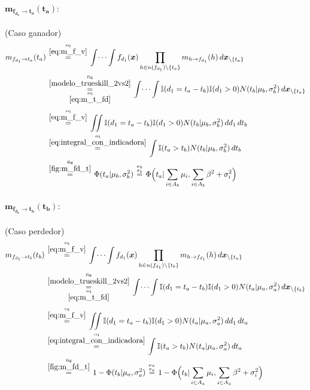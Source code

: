 \documentclass[article]{jss}
\newcommand\hfrac[2]{\genfrac{}{}{0pt}{}{#1}{#2}} %
\begin{document}
\begin{appendix}
\paragraph{$\bm{m_{f_{d_1} \rightarrow t_a}(t_a)}:$} (Caso ganador)
\begin{equation}\label{eq:m_fd_ta}
\begin{split}
m_{f_{d_1} \rightarrow t_a}(t_a) & \overset{\hfrac{\text{eq}}{\ref{eq:m_f_v}}}{=} \int \dots \int f_{d_1}(\bm{x}) \prod_{h \in n(f_{d_1}) \setminus \{t_a\} } m_{h \rightarrow f_{d_1}}(h) \, d\bm{x}_{\setminus \{t_a\} }  \\
&\overset{\hfrac{\text{fig}}{\ref{modelo_trueskill_2vs2}}}{\underset{\hfrac{\text{eq}}{\ref{eq:m_t_fd}}}{=}}  \int \dots \int \mathbb{I}(d_1 = t_a - t_b) \mathbb{I}(d_1 > 0) N(t_b | \mu_b , \sigma_b^2 )  \, d\bm{x}_{\setminus \{t_a\} } \\[0.1cm]
& \overset{\hfrac{\text{eq}}{\ref{eq:m_f_v}}}{=} \iint \mathbb{I}(d_1 = t_a - t_b) \mathbb{I}(d_1 > 0) N(t_b | \mu_b , \sigma_b^2 ) \, dd_1\,dt_b \\
& \overset{\hfrac{\text{eq}}{\ref{eq:integral_con_indicadora}}}{=} \int \mathbb{I}( t_a > t_b)  N(t_b | \mu_b , \sigma_b^2 ) \,dt_b  \\
& \overset{\hfrac{\text{fig}}{\ref{fig:m_fd_t}}}{=} \Phi (t_a| \mu_b, \sigma_b^2)  \overset{\hfrac{\mu_b}{\sigma_b}}{=}  \Phi \Big(t_a| \sum_{i \in A_b} \mu_i , \sum_{i \in A_b} \beta^2 + \sigma_i^2 \Big)
\end{split}
\end{equation}

\paragraph{$\bm{m_{f_{d_1} \rightarrow t_b}(t_b)}:$} (Caso perdedor)
\begin{equation}\label{eq:m_fd_tb}
\begin{split}
m_{f_{d_1} \rightarrow t_b}(t_b) &\overset{\hfrac{\text{eq}}{\ref{eq:m_f_v}}}{=} \int \dots \int f_{d_1}(\bm{x}) \prod_{h \in n(f_{d_1}) \setminus \{t_b\} } m_{h \rightarrow f_{d_1}}(h) \, d\bm{x}_{\setminus \{t_a\} }  \\
&\overset{\hfrac{\text{fig}}{\ref{modelo_trueskill_2vs2}}}{\underset{\hfrac{\text{eq}}{\ref{eq:m_t_fd}}}{=}}  \int \dots \int \mathbb{I}(d_1 = t_a - t_b) \mathbb{I}(d_1 > 0) N(t_a | \mu_a , \sigma_a^2 )  \, d\bm{x}_{\setminus \{t_b\} } \\[0.1cm]
&\overset{\hfrac{\text{eq}}{\ref{eq:m_f_v}}}{=} \iint \mathbb{I}(d_1 = t_a - t_b) \mathbb{I}(d_1 > 0)  N(t_a | \mu_a , \sigma_a^2 )  \, dd_1\,dt_a \\
&\overset{\hfrac{\text{eq}}{\ref{eq:integral_con_indicadora}}}{=} \int \mathbb{I}( t_a > t_b)   N(t_a | \mu_a , \sigma_a^2 ) \,dt_a \\
&\overset{\hfrac{\text{fig}}{\ref{fig:m_fd_t}}}{=} 1 - \Phi (t_b| \mu_a , \sigma_a^2 ) \overset{\hfrac{\mu_a}{\sigma_a}}{=} 1 - \Phi \Big(t_b| \sum_{i \in A_a} \mu_i , \sum_{i \in A_a} \beta^2 + \sigma_i^2 \Big)
\end{split}
\end{equation}


\end{appendix}
\end{document}
